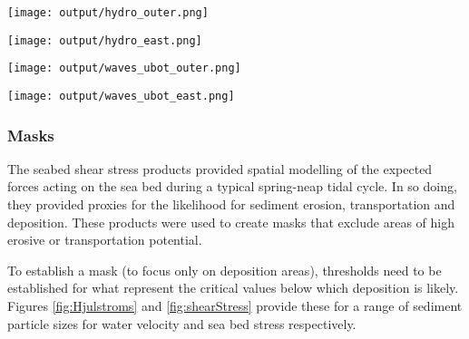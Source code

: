 \documentclass[a4paper]{article}
\let\origfigure=\figure
\let\endorigfigure=\endfigure
\renewenvironment{figure}[1][]{%
   \origfigure[H]
}{%
   \endorigfigure
}
\begin{document}
\begin{figure}
\centering\scriptsize
\texttt{[image: output/hydro\_outer.png]}
\caption{Outer Harbour extract of four hydrodynamic modeling tidal
products.\label{fig:hydro_outer}}
\end{figure}

\begin{figure}
\centering\scriptsize
\texttt{[image: output/hydro\_east.png]}
\caption{East Arm extract of four hydrodynamic modeling tidal
products.\label{fig:hydro_east}}
\end{figure}

\begin{figure}
\centering\scriptsize
\texttt{[image: output/waves\_ubot\_outer.png]}
\caption{Outer Harbour extract of five hydrodynamic modeling wave
products. The different products represent different wind angles (0, 90,
140, 270 and 315 degrees).\label{fig:waves_outer}}
\end{figure}

\begin{figure}
\centering\scriptsize
\texttt{[image: output/waves\_ubot\_east.png]}
\caption{East Arm extract of five hydrodynamic modeling wave products.
The different products represent different wind angles (0, 90, 140, 270
and 315 degrees).\label{fig:waves_east}}
\end{figure}

\hypertarget{masks}{%
\subsubsection{Masks}\label{masks}}

The seabed shear stress products provided spatial modelling of the
expected forces acting on the sea bed during a typical spring-neap tidal
cycle. In so doing, they provided proxies for the likelihood for
sediment erosion, transportation and deposition. These products were
used to create masks that exclude areas of high erosive or
transportation potential.

To establish a mask (to focus only on deposition areas), thresholds need
to be established for what represent the critical values below which
deposition is likely. Figures \ref{fig:Hjulstroms} and
\ref{fig:shearStress} provide these for a range of sediment particle
sizes for water velocity and sea bed stress respectively.
\end{document}
